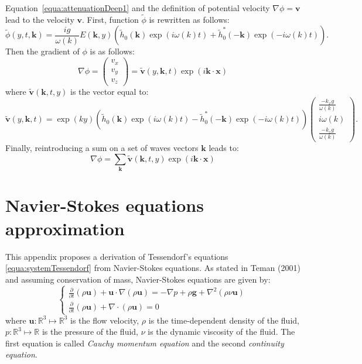 \documentclass[final]{jcgt}
\begin{document}
Equation~\ref{equa:attenuationDeep1} and the definition of potential velocity $\nabla\phi=\mathbf{v}$ lead to the velocity $\mathbf{v}$. First, function $\tilde{\phi}$ is rewritten as follows:
\begin{equation}
	\tilde{\phi}(y,t,\mathbf{k})=\frac{ig}{\omega(k)} E(\mathbf{k},y) \left(\tilde{h}_0(\mathbf{k})\exp(i\omega(k)t)+\tilde{h}_0^*(-\mathbf{k})\exp(-i\omega(k)t)\right).
\end{equation}
Then the gradient of $\phi$ is as follows:
\begin{equation}
	\nabla \phi = \begin{pmatrix}
		v_x \\
		v_y \\
		v_z
	\end{pmatrix} =\tilde{\mathbf{v}}(y,\mathbf{k},t)\exp\left(i\mathbf{k}\cdot\mathbf{x}\right)
\end{equation}
where $\tilde{\mathbf{v}}(\mathbf{k},t,y)$ is the vector equal to:
\begin{equation}
	\tilde{\mathbf{v}}(y,\mathbf{k},t) = \exp(ky)\left(\tilde{h}_0(\mathbf{k})\exp(i\omega(k)t)-\tilde{h}_0^*(-\mathbf{k})\exp(-i\omega(k)t)\right)
	\begin{pmatrix}
		\frac{-k_xg}{\omega(k)} \\
		i\omega(k)              \\
		\frac{-k_zg}{\omega(k)}
	\end{pmatrix}.
\end{equation}
Finally, reintroducing a sum on a set of waves vectors $\mathbf{k}$ leads to:
\begin{equation}
	\nabla \phi =
	\sum_{\mathbf{k}}\tilde{\mathbf{v}}(\mathbf{k},t, y)\exp\left(i\mathbf{k}\cdot\mathbf{x}\right)
\end{equation}


\section{Navier-Stokes equations approximation}\label{sec:annexe-NS}
This appendix proposes a derivation of Tessendorf's equations \ref{equa:systemTessendorf} from Navier-Stokes equations. As stated in Teman (2001) \cite{temamNavierStokesEquations2001} and assuming conservation of mass, Navier-Stokes equations are given by:
\begin{equation}
	\begin{cases}
		\frac{\partial}{\partial t}\left(\rho \mathbf{u}\right) + \mathbf{u} \cdot \nabla (\rho \mathbf{u}) = - \nabla p + \rho\mathbf{g} +  \nabla^2 (\rho\nu \mathbf{u}) \\
		\frac{\partial}{\partial t}\left(\rho \mathbf{u}\right) + \nabla\cdot (\rho\mathbf{u}) = 0
	\end{cases}
	\label{equa:ns0}
\end{equation}
where $\mathbf{u} :\mathbb{R}^3\mapsto \mathbb{R}^3$ is the flow velocity, $\rho$ is the time-dependent density of the fluid, $p: \mathbb{R}^3\mapsto \mathbb{R}$ is the pressure of the fluid, $\nu$ is the dynamic viscosity of the fluid.
The first equation is called \emph{Cauchy momentum equation} and the second \emph{continuity equation}.
\end{document}
